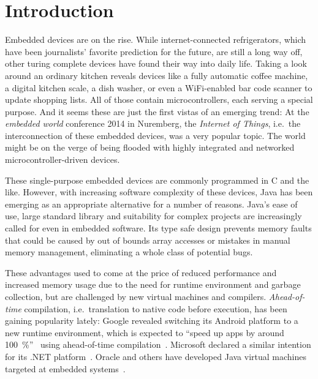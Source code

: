 
\chapter{Introduction}
	\label{chapter:intro}
	Embedded devices are on the rise. While internet-connected refrigerators, which have been journalists' favorite
	prediction for the future, are still a long way off, other turing complete devices have found their way into daily
	life. Taking a look around an ordinary kitchen reveals devices like a fully automatic coffee machine, a digital
	kitchen scale, a dish washer, or even a WiFi-enabled bar code scanner to update shopping lists. All of those contain
	microcontrollers, each serving a special purpose. And it seems these are just the first vistas of an emerging trend:
	At the \emph{embedded world} conference 2014 in Nuremberg, the \emph{Internet of Things}, i.e.\ the interconnection of
	these embedded devices, was a very popular topic. The world might be on the verge of being flooded with highly
	integrated and networked microcontroller-driven devices.


	These single-purpose embedded devices are commonly programmed in C and the like. However, with increasing software
	complexity of these devices, Java has been emerging as an appropriate alternative for a number of reasons. Java's ease
	of use, large standard library and suitability for complex projects are increasingly called for even in embedded
	software. Its type safe design prevents memory faults that could be caused by out of bounds array accesses or mistakes
	in manual memory management, eliminating a whole class of potential bugs.

	These advantages used to come at the price of reduced performance and increased memory usage due to the need for
	runtime environment and garbage collection, but are challenged by new virtual machines and compilers.
	\emph{Ahead-of-time} compilation, i.e.\ translation to native code before execution, has been gaining popularity
	lately: Google revealed switching its Android platform to a new runtime environment, which is expected to
	\enquote{speed up apps by around 100~\%}~\cite{anthony:13:android-art} using ahead-of-time
	compilation~\cite{lindner:14:android-art}. Microsoft declared a similar intention for its .NET
	platform~\cite{lardinois:14:dotnet-aot}. Oracle and others have developed Java virtual machines targeted at embedded
	systems~\cite{merritt:13:java-for-IoT, maxfield:12:IS2T-JVM}.

